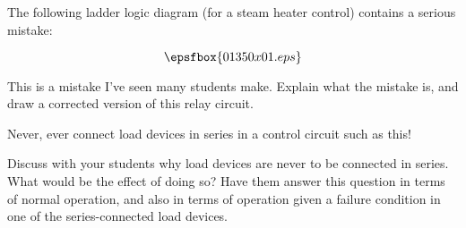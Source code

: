 

The following ladder logic diagram (for a steam heater control) contains a serious mistake:

$$\epsfbox{01350x01.eps}$$

This is a mistake I've seen many students make.  Explain what the mistake is, and draw a corrected version of this relay circuit.







Never, ever connect load devices in series in a control circuit such as this!







Discuss with your students why load devices are never to be connected in series.  What would be the effect of doing so?  Have them answer this question in terms of normal operation, and also in terms of operation given a failure condition in one of the series-connected load devices.



